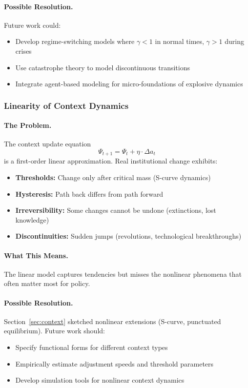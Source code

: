 \paragraph{Possible Resolution.}
Future work could:
\begin{itemize}
  \item Develop regime-switching models where $\gamma < 1$ in normal times, $\gamma > 1$ during crises
  \item Use catastrophe theory to model discontinuous transitions
  \item Integrate agent-based modeling \citep{tesfatsion2006} for micro-foundations of explosive dynamics
\end{itemize}

\subsubsection{Linearity of Context Dynamics}

\paragraph{The Problem.}
The context update equation
\begin{equation}
  \Psi_{t+1} = \Psi_t + \eta \cdot \Delta a_t
\end{equation}
is a first-order linear approximation. Real institutional change exhibits:
\begin{itemize}
  \item \textbf{Thresholds:} Change only after critical mass (S-curve dynamics)
  \item \textbf{Hysteresis:} Path back differs from path forward
  \item \textbf{Irreversibility:} Some changes cannot be undone (extinctions, lost knowledge)
  \item \textbf{Discontinuities:} Sudden jumps (revolutions, technological breakthroughs)
\end{itemize}

\paragraph{What This Means.}
The linear model captures tendencies but misses the nonlinear phenomena
that often matter most for policy.

\paragraph{Possible Resolution.}
Section~\ref{sec:context} sketched nonlinear extensions (S-curve, punctuated equilibrium).
Future work should:
\begin{itemize}
  \item Specify functional forms for different context types
  \item Empirically estimate adjustment speeds and threshold parameters
  \item Develop simulation tools for nonlinear context dynamics
\end{itemize}

